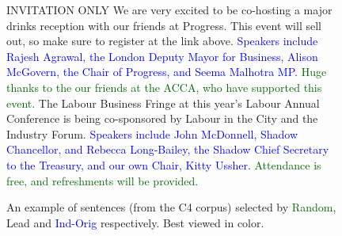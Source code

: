 \begin{figure}[h!]
\centering
\begin{mdframed}
\small
\textcolor{amaranth}{INVITATION ONLY We are very excited to be co-hosting a major drinks reception with our friends at Progress. This event will sell out, so make sure to register at the link above.}
\textcolor{blue}{Speakers include Rajesh Agrawal, the London Deputy Mayor for Business, Alison McGovern, the Chair of Progress, and Seema Malhotra MP.}
\textcolor{darkgreen}{Huge thanks to the our friends at the ACCA, who have supported this event.} 
The Labour Business Fringe at this year's Labour Annual Conference is being co-sponsored by Labour in the City and the Industry Forum. 
\textcolor{blue}{Speakers include John McDonnell, Shadow Chancellor, and Rebecca Long-Bailey, the Shadow Chief Secretary to the Treasury, and our own Chair, Kitty Ussher.} 
\textcolor{darkgreen}{Attendance is free, and refreshments will be provided.}
\end{mdframed}
\caption{An example of sentences (from the C4 corpus) selected by \textcolor{darkgreen}{Random}, \textcolor{amaranth}{Lead} and \textcolor{blue}{Ind-Orig} respectively. Best viewed in color.}
\label{fig:sentence_selection_example}
\end{figure}